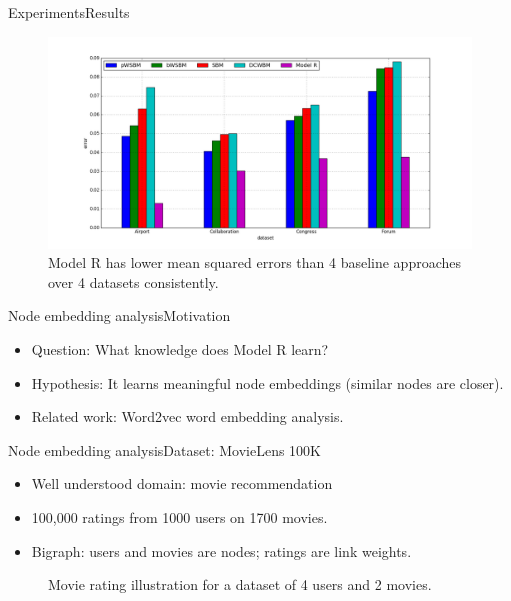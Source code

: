 \documentclass{beamer}
\begin{document}
\begin{frame}{Experiments}{Results}
	\begin{figure}[H]\centering
		\includegraphics[width=\textwidth]{link-weight-errors}
		\caption{
			Model R has lower mean squared errors than 4 baseline approaches over 4 datasets consistently.
		}
		\label{fig:errors}
	\end{figure}
\end{frame}

\begin{frame}{Node embedding analysis}{Motivation}
	\begin{itemize}
		\item Question: What knowledge does Model R learn?
		\item Hypothesis: It learns meaningful node embeddings (similar nodes are closer).
		\item Related work: Word2vec word embedding analysis.
	\end{itemize}
\end{frame}

\begin{frame}{Node embedding analysis}{Dataset: MovieLens 100K}
	\begin{itemize}
		\item Well understood domain: movie recommendation
		\item 100,000 ratings from 1000 users on 1700 movies.
		\item Bigraph: users and movies are nodes; ratings are link weights.
	\end{itemize}
	\begin{figure}[H]\centering
		\caption{Movie rating illustration for a dataset of 4 users and 2 movies.}
		\label{fig:movie}
	\end{figure}
\end{frame}
\end{document}
